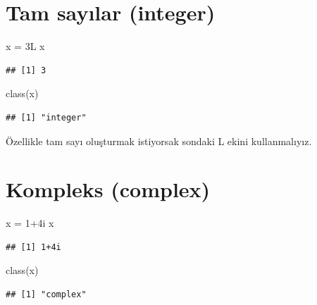 \documentclass[
]{book}
\newenvironment{Shaded}{\begin{snugshade}}{\end{snugshade}}
\newcommand{\DecValTok}[1]{\textcolor[rgb]{0.00,0.00,0.81}{#1}}
\newcommand{\FunctionTok}[1]{\textcolor[rgb]{0.00,0.00,0.00}{#1}}
\newcommand{\NormalTok}[1]{#1}
\newcommand{\OtherTok}[1]{\textcolor[rgb]{0.56,0.35,0.01}{#1}}
\newcommand{\SpecialCharTok}[1]{\textcolor[rgb]{0.00,0.00,0.00}{#1}}
\begin{document}
\hypertarget{tam-sayux131lar-integer}{%
\section{Tam sayılar (integer)}\label{tam-sayux131lar-integer}}

\begin{Shaded}
\begin{Highlighting}[]
\NormalTok{x }\OtherTok{=}\NormalTok{ 3L}
\NormalTok{x}
\end{Highlighting}
\end{Shaded}

\begin{verbatim}
## [1] 3
\end{verbatim}

\begin{Shaded}
\begin{Highlighting}[]
\FunctionTok{class}\NormalTok{(x)}
\end{Highlighting}
\end{Shaded}

\begin{verbatim}
## [1] "integer"
\end{verbatim}

Özellikle tam sayı oluşturmak istiyorsak sondaki L ekini kullanmalıyız.

\hypertarget{kompleks-complex}{%
\section{Kompleks (complex)}\label{kompleks-complex}}

\begin{Shaded}
\begin{Highlighting}[]
\NormalTok{x }\OtherTok{=} \DecValTok{1}\SpecialCharTok{+}\NormalTok{4i}
\NormalTok{x}
\end{Highlighting}
\end{Shaded}

\begin{verbatim}
## [1] 1+4i
\end{verbatim}

\begin{Shaded}
\begin{Highlighting}[]
\FunctionTok{class}\NormalTok{(x)}
\end{Highlighting}
\end{Shaded}

\begin{verbatim}
## [1] "complex"
\end{verbatim}
\end{document}
